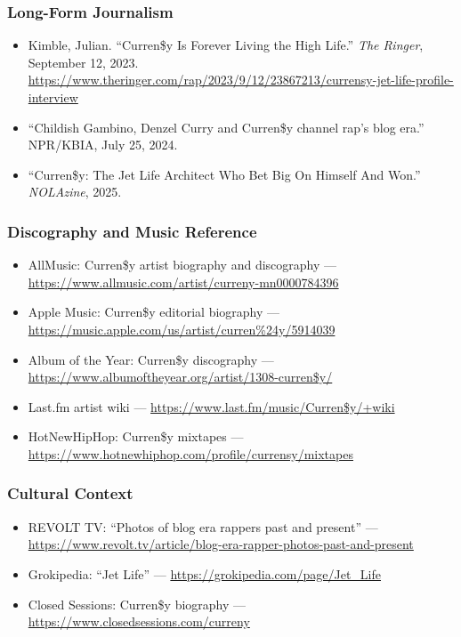 \documentclass[11pt,letterpaper]{article}
\begin{document}
\subsubsection{Long-Form Journalism}
\begin{itemize}[leftmargin=1.5em]
  \item Kimble, Julian. ``Curren\$y Is Forever Living the High Life.'' \textit{The Ringer}, September 12, 2023. \url{https://www.theringer.com/rap/2023/9/12/23867213/currensy-jet-life-profile-interview}
  \item ``Childish Gambino, Denzel Curry and Curren\$y channel rap's blog era.'' NPR/KBIA, July 25, 2024.
  \item ``Curren\$y: The Jet Life Architect Who Bet Big On Himself And Won.'' \textit{NOLAzine}, 2025.
\end{itemize}

\subsubsection{Discography and Music Reference}
\begin{itemize}[leftmargin=1.5em]
  \item AllMusic: Curren\$y artist biography and discography — \url{https://www.allmusic.com/artist/curreny-mn0000784396}
  \item Apple Music: Curren\$y editorial biography — \url{https://music.apple.com/us/artist/curren\%24y/5914039}
  \item Album of the Year: Curren\$y discography — \url{https://www.albumoftheyear.org/artist/1308-curren\$y/}
  \item Last.fm artist wiki — \url{https://www.last.fm/music/Curren\$y/+wiki}
  \item HotNewHipHop: Curren\$y mixtapes — \url{https://www.hotnewhiphop.com/profile/currensy/mixtapes}
\end{itemize}

\subsubsection{Cultural Context}
\begin{itemize}[leftmargin=1.5em]
  \item REVOLT TV: ``Photos of blog era rappers past and present'' — \url{https://www.revolt.tv/article/blog-era-rapper-photos-past-and-present}
  \item Grokipedia: ``Jet Life'' — \url{https://grokipedia.com/page/Jet_Life}
  \item Closed Sessions: Curren\$y biography — \url{https://www.closedsessions.com/curreny}
\end{itemize}
\end{document}
